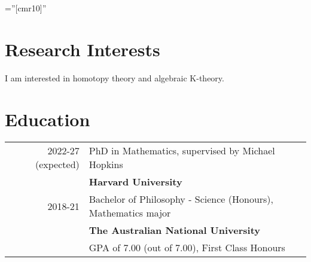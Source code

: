 \documentclass[a4paper,10pt]{article} %
\begin{document}
\pagestyle{empty} %

\font\fb=''[cmr10]'' %


\par{\par} %
\par{\par}


\section{Research Interests}

I am interested in homotopy theory and algebraic K-theory.


\section{Education}

\begin{tabular}{rl}	
2022-27 (expected) & PhD in Mathematics, supervised by Michael Hopkins\\
& \normalsize\textbf{Harvard University}\\

2018-21 &  Bachelor of Philosophy - Science (Honours), Mathematics major\\& \normalsize\textbf{The Australian National University}\\
&GPA of 7.00 (out of 7.00), First Class Honours\\

\end{tabular}

\end{document}
